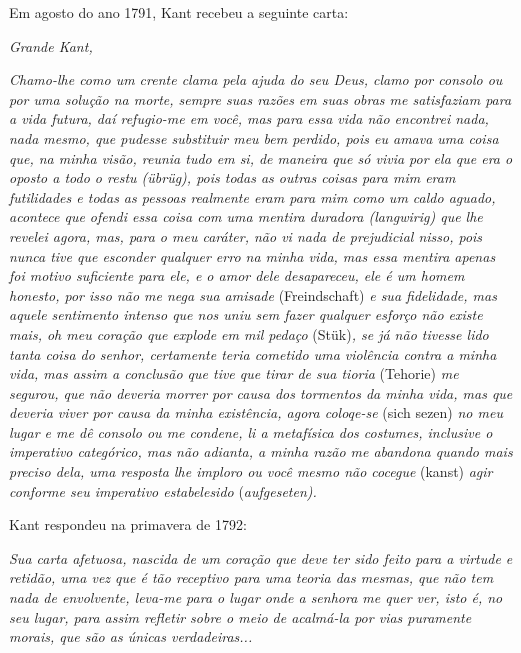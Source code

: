 Em agosto do ano 1791, Kant recebeu a seguinte carta:

\emph{Grande Kant,}

\emph{Chamo-lhe como um crente clama pela ajuda do seu Deus, clamo por
consolo ou por uma solução na morte, sempre suas razões em suas obras me
satisfaziam para a vida futura, daí refugio-me em você, mas para essa
vida não encontrei nada, nada mesmo, que pudesse substituir meu bem
perdido, pois eu amava uma coisa que, na minha visão, reunia tudo em si,
de maneira que só vivia por ela que era o oposto a todo o restu (übrüg),
pois todas as outras coisas para mim eram futilidades e todas as pessoas
realmente eram para mim como um caldo aguado, acontece que ofendi essa
coisa com uma mentira duradora (langwirig) que lhe revelei agora, mas,
para o meu caráter, não vi nada de prejudicial nisso, pois nunca tive
que esconder qualquer erro na minha vida, mas essa mentira apenas foi
motivo suficiente para ele, e o amor dele desapareceu, ele é um homem
honesto, por isso não me nega sua amisade} (Freindschaft) \emph{e sua
fidelidade, mas aquele sentimento intenso que nos uniu sem fazer
qualquer esforço não existe mais, oh meu coração que explode em mil
pedaço} (Stük)\emph{, se já não tivesse lido tanta coisa do senhor,
certamente teria cometido uma violência contra a minha vida, mas assim a
conclusão que tive que tirar de sua tioria} (Tehorie) \emph{me segurou,
que não deveria morrer por causa dos tormentos da minha vida, mas que
deveria viver por causa da minha existência, agora coloqe-se} (sich
sezen) \emph{no meu lugar e me dê consolo ou me condene, li a metafísica
dos costumes, inclusive o imperativo categórico, mas não adianta, a
minha razão me abandona quando mais preciso dela, uma resposta lhe
imploro ou você mesmo não cocegue} (kanst) \emph{agir conforme seu
imperativo estabelesido} (\emph{aufgeseten). }

Kant respondeu na primavera de 1792:

\emph{Sua carta afetuosa, nascida de um coração que deve ter sido feito
para a virtude e retidão, uma vez que é tão receptivo para uma teoria
das mesmas, que não tem nada de envolvente, leva-me para o lugar onde a
senhora me quer ver, isto é, no seu lugar, para assim refletir sobre o
meio de acalmá-la por vias puramente morais, que são as únicas
verdadeiras...}

